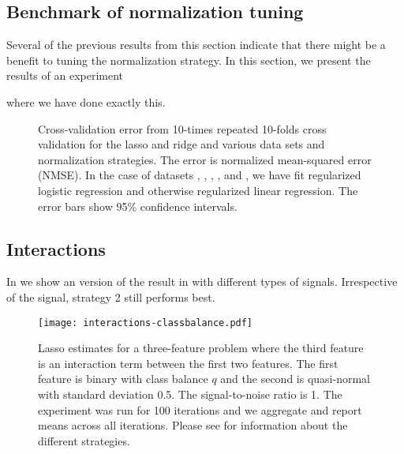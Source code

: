 \subsection{Benchmark of normalization tuning} \label{sec:normalization-tuning}

Several of the previous results from this section indicate that there might be a benefit to
tuning the normalization strategy. In this section, we present the results of an experiment

where we have done exactly this.

\begin{figure*}[htpb]
  \centering
  \caption{%
    Cross-validation error from 10-times repeated 10-folds cross validation for the lasso and ridge
    and various data sets and normalization strategies. The error is normalized mean-squared
    error (NMSE). In the case of datasets , , , ,
    and , we have fit regularized logistic regression and
    otherwise regularized linear regression. The error bars show 95\% confidence intervals.
  }
\end{figure*}

\subsection{Interactions}%
\label{sec:additional-experiments-interactions}

In  we show an version of the result in 
with different types of signals. Irrespective of the signal, strategy 2 still performs
best.

\begin{figure}[htpb]
  \centering
  \texttt{[image: interactions-classbalance.pdf]}
  \caption{%
    Lasso estimates for a three-feature problem where the third feature is an
    interaction term between the first two features. The first feature is
    binary with class balance \(q\) and the second is quasi-normal with
    standard deviation 0.5. The signal-to-noise ratio is 1. The experiment was
    run for 100 iterations and we aggregate and report means across all
    iterations. Please see  for information
    about the different strategies.
  }
  \label{fig:interactions-full}
\end{figure}

